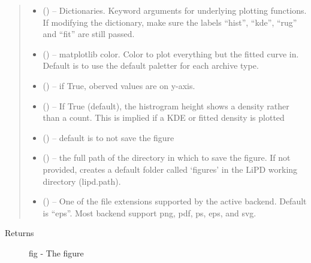\documentclass[letterpaper,10pt,english]{sphinxmanual}
\begin{document}
\begin{fulllineitems}
\begin{quote}
\begin{description}
\begin{itemize}
\item {} 
\sphinxstyleliteralstrong{, }\sphinxstyleliteralstrong{, } (\sphinxstyleliteralemphasis{,}\sphinxstyleliteralemphasis{}) -- Dictionaries. Keyword arguments for
underlying plotting functions. If modifying the dictionary, make
sure the labels ``hist'', ``kde'', ``rug'' and ``fit'' are still passed.

\item {} 
 () -- matplotlib color. Color to plot everything but the
fitted curve in. Default is to use the default paletter for each
archive type.

\item {} 
 () -- if True, oberved values are on y-axis.

\item {} 
 () -- If True (default), the histrogram height shows
a density rather than a count. This is implied if a KDE or
fitted density is plotted

\item {} 
 () -- default is to not save the figure

\item {} 
 () -- the full path of the directory in which to save the figure.
If not provided, creates a default folder called `figures' in the
LiPD working directory (lipd.path).

\item {} 
 () -- One of the file extensions supported by the active
backend. Default is ``eps''. Most backend support png, pdf, ps, eps,
and svg.

\end{itemize}

\end{description}\end{quote}
\begin{description}
\item[{Returns}] \leavevmode
fig - The figure

\end{description}

\end{fulllineitems}
\end{document}
